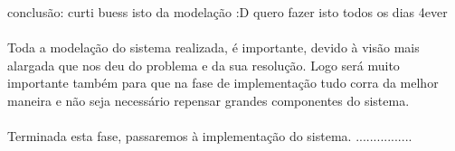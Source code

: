 conclusão: curti buess  isto da modelação :D quero fazer isto todos os dias 4ever\\
\\
Toda a modelação do sistema realizada, é importante, devido à visão mais alargada que nos deu do problema e da sua resolução.
Logo será muito importante também para que na fase de implementação tudo corra da melhor maneira e não seja necessário repensar grandes componentes
do sistema.\\ 
\\
Terminada esta fase, passaremos à implementação do sistema. ................